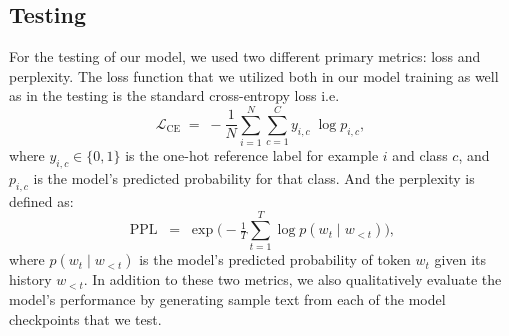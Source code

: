 \subsection{Testing}
For the testing of our model, we used two different primary metrics: loss and perplexity. The loss function that we utilized both in our model training as 
well as in the testing is the standard cross-entropy loss i.e. 
\begin{equation}
\mathcal{L}_{\text{CE}}
  \;=\;
  -\frac{1}{N}\sum_{i=1}^{N}\sum_{c=1}^{C}
  y_{i,c}\;\log p_{i,c},
\end{equation}
where $y_{i,c} \in \{0,1\}$ is the one-hot reference label for example $i$ and class $c$, and $p_{i,c}$ is the model's predicted probability for that class.
And the perplexity is defined as:
\begin{equation}
\operatorname{PPL}
  \;=\;
  \exp\!\bigl(
      -\tfrac{1}{T}\sum_{t=1}^{T} \log p(w_t \mid w_{<t})
    \bigr),
\end{equation}
where $p(w_t \mid w_{<t})$ is the model’s predicted probability of token $w_t$ given its history $w_{<t}$.
In addition to these two metrics, we also qualitatively evaluate the model's performance by generating sample text from 
each of the model checkpoints that we test. 
